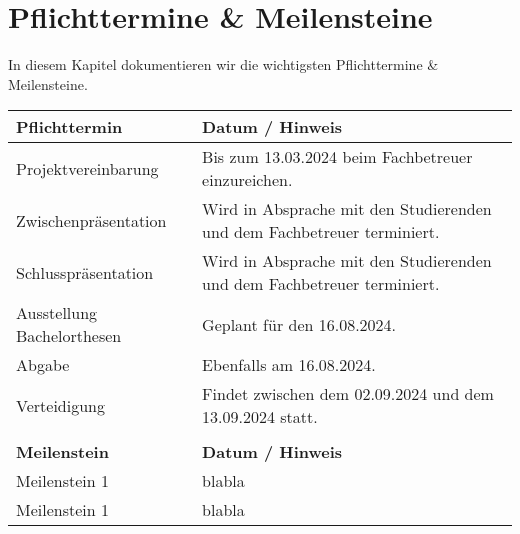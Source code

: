 
\section{Pflichttermine \& Meilensteine}
In diesem Kapitel dokumentieren wir die wichtigsten Pflichttermine \& Meilensteine.

\begin{table}[ht]
    \centering
    \begin{tabular}{@{}lp{8cm}@{}}
        \toprule
        \textbf{Pflichttermin} & \textbf{Datum / Hinweis} \\
        \midrule
        Projektvereinbarung & Bis zum 13.03.2024 beim Fachbetreuer einzureichen. \\
        \midrule
        Zwischenpräsentation & Wird in Absprache mit den Studierenden und dem Fachbetreuer terminiert. \\
        \midrule
        Schlusspräsentation & Wird in Absprache mit den Studierenden und dem Fachbetreuer terminiert. \\
        \midrule
        Ausstellung Bachelorthesen & Geplant für den 16.08.2024. \\
        \midrule
        Abgabe & Ebenfalls am 16.08.2024. \\
        \midrule
        Verteidigung & Findet zwischen dem 02.09.2024 und dem 13.09.2024 statt. \\
        \\
        \toprule
        \textbf{Meilenstein} & \textbf{Datum / Hinweis} \\
        \midrule
        Meilenstein 1  & blabla \\
        \midrule
        Meilenstein 1  & blabla \\
        \bottomrule
    \end{tabular}
\end{table}

